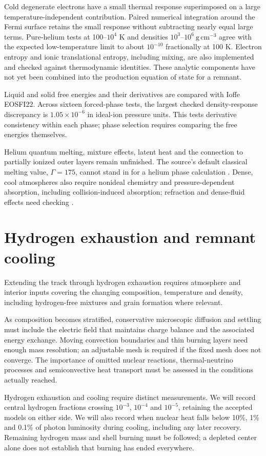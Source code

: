 \documentclass[11pt,letterpaper]{article}
\begin{document}
Cold degenerate electrons have a small thermal response superimposed on a
large temperature-independent contribution. Paired numerical integration
around the Fermi surface retains the small response without subtracting
nearly equal large terms. Pure-helium tests at 100--$10^4$ K and densities
$10^3$--$10^6\ \mathrm{g\,cm^{-3}}$ agree with the expected low-temperature
limit to about $10^{-10}$ fractionally at 100 K. Electron entropy and ionic
translational entropy, including mixing, are also implemented and checked
against thermodynamic identities. These analytic components have not yet been
combined into the production equation of state for a remnant.

Liquid and solid free energies and their derivatives are compared with
Ioffe EOSFI22. Across sixteen forced-phase tests, the largest checked
density-response discrepancy is $1.05\times10^{-6}$ in ideal-ion pressure
units. This tests derivative consistency within each phase; phase selection
requires comparing the free energies themselves.

Helium quantum melting, mixture effects, latent heat and the connection to
partially ionized outer layers remain unfinished. The source's default
classical melting value, $\Gamma=175$, cannot stand in for a helium phase
calculation \cite{baiko22}. Dense, cool atmospheres also require nonideal
chemistry and pressure-dependent absorption, including collision-induced
absorption; refraction and dense-fluid effects need checking \cite{blouin18}.

\section{Hydrogen exhaustion and remnant cooling}
Extending the track through hydrogen exhaustion requires atmosphere and
interior inputs covering the changing composition, temperature and density,
including hydrogen-free mixtures and grain formation where relevant.

As composition becomes stratified, conservative microscopic diffusion and
settling must include the electric field that maintains charge balance and
the associated energy exchange. Moving convection boundaries and thin burning
layers need enough mass resolution; an adjustable mesh is required if the
fixed mesh does not converge. The importance of omitted nuclear reactions,
thermal-neutrino processes and semiconvective heat transport must be assessed
in the conditions actually reached.

Hydrogen exhaustion and cooling require distinct measurements. We will record
central hydrogen fractions crossing $10^{-3}$, $10^{-4}$ and $10^{-5}$, retaining
the accepted models on either side. We will also record when nuclear heat
falls below 10\%, 1\% and 0.1\% of photon luminosity during cooling, including
any later recovery. Remaining hydrogen mass and shell burning must be followed;
a depleted center alone does not establish that burning has ended everywhere.
\end{document}
